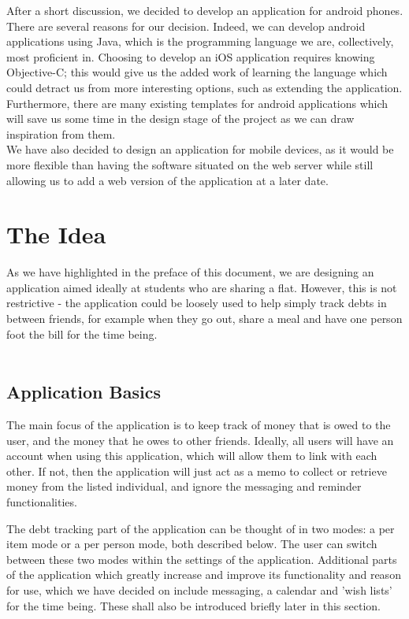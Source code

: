 \documentclass[a4paper,9t]{article}
\begin{document}
After a short discussion, we decided to develop an application for android phones. There are several reasons for our decision. Indeed, we can develop android applications using Java, which is the programming language we are, collectively, most proficient in. Choosing to develop an iOS application requires knowing Objective-C; this would give us the added work of learning the language which could detract us from more interesting options, such as extending the application. Furthermore, there are many existing templates for android applications which will save us some time in the design stage of the project as we can draw inspiration from them. \\
We have also decided to design an application for mobile devices, as it would be more flexible than having the software situated on the web server while still allowing us to add a web version of the application at a later date.

\section*{The Idea}
As we have highlighted in the preface of this document, we are designing an application aimed ideally at students who are sharing a flat. However, this is not restrictive - the application could be loosely used to help simply track debts in between friends, for example when they go out, share a meal and have one person foot the bill for the time being.\\

\\
\subsection*{Application Basics}
The main focus of the application is to keep track of money that is owed to the user, and the money that he owes to other friends. Ideally, all users will have an account when using this application, which will allow them to link with each other. If not, then the application will just act as a memo to collect or retrieve money from the listed individual, and ignore the messaging and reminder functionalities. 

The debt tracking part of the application can be thought of in two modes: a per item mode or a per person mode, both described below. The user can switch between these two modes within the settings of the application.  
Additional parts of the application which greatly increase and improve its functionality and reason for use, which we have decided on include messaging, a calendar and 'wish lists' for the time being. These shall also be introduced briefly later in this section.
\end{document}
